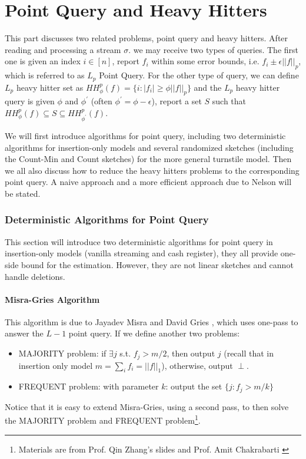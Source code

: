 \documentclass[11pt]{article}
\theoremstyle{plain}
\begin{document}
\pagebreak
\part{Point Query and Heavy Hitters}
\label{p:pq-hh}

This part discusses two related problems, point query and heavy hitters. After 
reading and processing a stream $\sigma$. we may receive two types of 
queries. The first one is given an index $i\in [n]$, report $f_i$ within some error 
bounds, i.e. $f_i \pm \epsilon||f||_p$, which is referred to as $L_p$ Point Query. 
For the other type of query, we can define $L_p$ heavy hitter set as 
$HH_{\phi}^p(f)=\{i:|f_i|\geq \phi||f||_p\}$ and the $L_p$ heavy hitter query is 
given $\phi$ and $\phi^{\prime}$ (often $\phi^{\prime}=\phi-\epsilon$), report a 
set $S$ such that $HH_{\phi}^p(f)\subseteq S \subseteq 
HH_{\phi^{\prime}}^p(f)$. 

We will first introduce algorithms for point query, including two deterministic 
algorithms for insertion-only models and several randomized sketches 
(including the Count-Min and Count sketches) for the 
more general turnstile model. Then we all also discuss how to reduce the heavy 
hitters problems to the corresponding point query. A naive approach and a more 
efficient approach due to Nelson will be stated. 

\section{Deterministic Algorithms for Point Query}

This section will introduce two deterministic algorithms for point query in 
insertion-only models (vanilla streaming and cash register), they all provide 
one-side bound for the estimation. However, they are not linear sketches and 
cannot handle deletions. 

\subsection{Misra-Gries Algorithm}
This algorithm is due to Jayadev Misra	and David Gries \cite{Misragries1982}, 
which uses one-pass to answer the $L-1$ point query. If we define another two 
problems: 
\begin{itemize}
	\item MAJORITY problem:  if $\exists j$ s.t. $f_ j > m/2$, then output $j$ 
	(recall that in insertion only model $m=\sum_i f_i = ||f||_1$), otherwise, output 
	$\perp$. 
	\item FREQUENT problem: with parameter $k$: output the set $\{j : f_ j > 
	m/k\}$
\end{itemize}
Notice that it is easy to extend Misra-Gries, using a second pass, to then solve 
the MAJORITY problem and FREQUENT problem\footnote{Materials are from 
Prof. Qin Zhang's slides  \cite{zhang2017-slides} and Prof. Amit 
Chakrabarti  \cite{Cha2015-notes}}.
\end{document}
